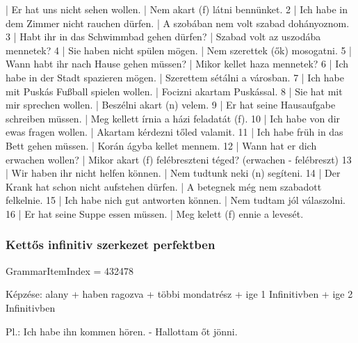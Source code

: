 \documentclass{article}
\newenvironment{desc}{\verbatim}{\endverbatim}
\newenvironment{exmp}{\verbatim}{\endverbatim}
\begin{document}
\begin{exmp}
1 | Er hat uns nicht sehen wollen. | Nem akart (f) látni bennünket.
2 | Ich habe in dem Zimmer nicht rauchen dürfen. | A szobában nem volt szabad dohányoznom.
3 | Habt ihr in das Schwimmbad gehen dürfen? | Szabad volt az uszodába mennetek?
4 | Sie haben nicht spülen mögen. | Nem szerettek (ők) mosogatni.
5 | Wann habt ihr nach Hause gehen müssen? | Mikor kellet haza mennetek?
6 | Ich habe in der Stadt spazieren mögen. | Szerettem sétálni a városban.
7 | Ich habe mit Puskás Fußball spielen wollen. | Focizni akartam Puskással.
8 | Sie hat mit mir sprechen wollen. | Beszélni akart (n) velem.
9 | Er hat seine Hausaufgabe schreiben müssen. | Meg kellett írnia a házi feladatát (f).
10 | Ich habe von dir ewas fragen wollen. | Akartam kérdezni tőled valamit.
11 | Ich habe früh in das Bett gehen müssen. | Korán ágyba kellet mennem.
12 | Wann hat er dich erwachen wollen? | Mikor akart (f) felébreszteni téged? (erwachen - felébreszt)
13 | Wir haben ihr nicht helfen können. | Nem tudtunk neki (n) segíteni.
14 | Der Krank hat schon nicht aufstehen dürfen. | A betegnek még nem szabadott felkelnie.
15 | Ich habe nich gut antworten können. | Nem tudtam jól válaszolni.
16 | Er hat seine Suppe essen müssen. | Meg kelett (f) ennie a levesét.
\end{exmp}

\subsubsection{Kettős infinitiv szerkezet perfektben}

GrammarItemIndex = 432478

\begin{desc}
Képzése:
alany + haben ragozva + többi mondatrész + ige 1 Infinitivben + ige 2 Infinitivben

Pl.: Ich habe ihn kommen hören. - Hallottam őt jönni.
\end{desc}
\end{document}
